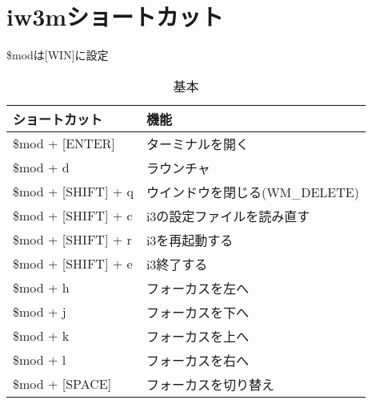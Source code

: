\documentclass[a4j, landscape, twocolumn, dvipdfmx]{jsarticle}
\begin{document}
\section{iw3mショートカット}

\$modは[WIN]に設定\footnotemark[1]

\begin{table}[htb]
  \begin{center}
    \caption{基本}
    \begin{tabular}{|l|l|} \hline
      ショートカット & 機能 \\ \hline \hline
      \$mod + [ENTER] & ターミナルを開く \\ \hline
      \$mod + d & ラウンチャ \\ \hline
      \$mod + [SHIFT] + q & ウインドウを閉じる(WM\_DELETE) \\ \hline
      \$mod + [SHIFT] + c & i3の設定ファイルを読み直す \\ \hline
      \$mod + [SHIFT] + r & i3を再起動する \\ \hline
      \$mod + [SHIFT] + e & i3終了する \\ \hline \hline
      \$mod + h & フォーカスを左へ\footnotemark[2] \\ \hline
      \$mod + j & フォーカスを下へ\footnotemark[2] \\ \hline
      \$mod + k & フォーカスを上へ\footnotemark[2] \\ \hline
      \$mod + l & フォーカスを右へ\footnotemark[2] \\ \hline
      \$mod + [SPACE] & フォーカスを切り替え \\ \hline
    \end{tabular}
  \end{center}
\end{table}
\end{document}
